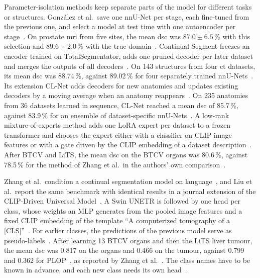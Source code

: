 Parameter-isolation methods keep separate parts of the model for different tasks or structures.
González et al.\ save one nnU-Net per stage, each fine-tuned from the previous one, and select a model at test time with one autoencoder per stage~\cite{gonzalez2023wrongcontinuallearningmedical}.
On prostate \gls{mri} from five sites, the mean \gls{dsc} was $87.0 \pm 6.5$\,\% with this selection and $89.6 \pm 2.0$\,\% with the true domain~\cite{gonzalez2023wrongcontinuallearningmedical}.
Continual Segment freezes an encoder trained on TotalSegmentator, adds one pruned decoder per later dataset and merges the outputs of all decoders~\cite{ji2023continualsegmentsingleunified}.
On 143 structures from four \gls{ct} datasets, its mean \gls{dsc} was 88.74\,\%, against 89.02\,\% for four separately trained nnU-Nets~\cite{ji2023continualsegmentsingleunified}.
Its extension CL-Net adds decoders for new anatomies and updates existing decoders by a moving average when an anatomy reappears~\cite{guo2025continuallearningdrivenmodelaccurate}.
On 235 anatomies from 36 datasets learned in sequence, CL-Net reached a mean \gls{dsc} of 85.7\,\%, against 83.9\,\% for an ensemble of dataset-specific nnU-Nets~\cite{guo2025continuallearningdrivenmodelaccurate}.
A low-rank mixture-of-experts method adds one LoRA expert per dataset to a frozen transformer and chooses the expert either with a classifier on CLIP image features or with a gate driven by the CLIP embedding of a dataset description~\cite{chen2024lowrankmoe}.
After BTCV and LiTS, the mean \gls{dsc} on the BTCV organs was 80.6\,\%, against 78.5\,\% for the method of Zhang et al.\ in the authors' own comparison~\cite{chen2024lowrankmoe}.

Zhang et al.\ condition a continual segmentation model on language~\cite{zhang2023continuallearningabdominalmultiorgan}, and Liu et al.\ report the same benchmark with identical results in a journal extension of the CLIP-Driven Universal Model~\cite{liu2024universalextensible}.
A Swin UNETR is followed by one head per class, whose weights an MLP generates from the pooled image features and a fixed CLIP embedding of the template ``A computerized tomography of a [CLS]''~\cite{zhang2023continuallearningabdominalmultiorgan,liu2024universalextensible}.
For earlier classes, the predictions of the previous model serve as pseudo-labels~\cite{zhang2023continuallearningabdominalmultiorgan,liu2024universalextensible}.
After learning 13 BTCV organs and then the LiTS liver tumour, the mean \gls{dsc} was 0.817 on the organs and 0.466 on the tumour, against 0.799 and 0.362 for PLOP~\cite{douillard2021ploplearningforgettingcontinual}, as reported by Zhang et al.~\cite{zhang2023continuallearningabdominalmultiorgan}.
The class names have to be known in advance, and each new class needs its own head~\cite{zhang2023continuallearningabdominalmultiorgan,liu2024universalextensible}.

